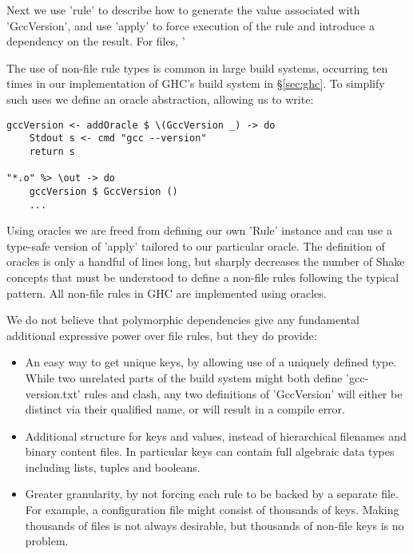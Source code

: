 Next we use \lst'rule' to describe how to generate the value associated with \lst'GccVersion', and use 'apply' to force execution of the rule and introduce a dependency on the result. For files, \lst'%

The use of non-file rule types is common in large build systems, occurring ten times in our implementation of GHC's build system in \S\ref{sec:ghc}. To simplify such uses we define an oracle abstraction, allowing us to write:

\begin{lstlisting}
gccVersion <- addOracle $ \(GccVersion _) -> do
    Stdout s <- cmd "gcc --version"
    return s

"*.o" %> \out -> do
    gccVersion $ GccVersion ()
    ...
\end{lstlisting}

Using oracles we are freed from defining our own \lst'Rule' instance and can use a type-safe version of \lst'apply' tailored to our particular oracle. The definition of oracles is only a handful of lines long, but sharply decreases the number of Shake concepts that must be understood to define a non-file rules following the typical pattern. All non-file rules in GHC are implemented using oracles.

We do not believe that polymorphic dependencies give any fundamental additional expressive power over file rules, but they do provide:

\begin{itemize}
\item An easy way to get unique keys, by allowing use of a uniquely defined type. While two unrelated parts of the build system might both define \lst'gcc-version.txt' rules and clash, any two definitions of \lst'GccVersion' will either be distinct via their qualified name, or will result in a compile error.
\item Additional structure for keys and values, instead of hierarchical filenames and binary content files. In particular keys can contain full algebraic data types including lists, tuples and booleans.
\item Greater granularity, by not forcing each rule to be backed by a separate file. For example, a configuration file might consist of thousands of keys. Making thousands of files is not always desirable, but thousands of non-file keys is no problem.
\end{itemize}
 
